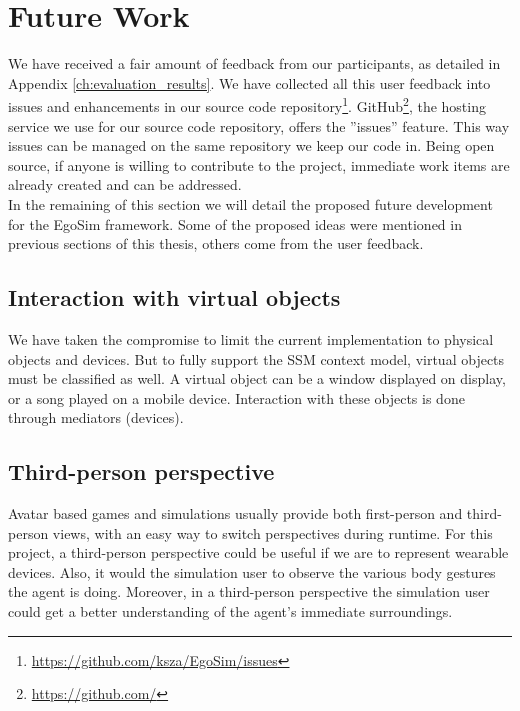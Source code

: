 \section{Future Work} %
\label{sec:future_work}
We have received a fair amount of feedback from our participants, as detailed in Appendix \ref{ch:evaluation_results}. We have collected all this user feedback into issues and enhancements in our source code repository\footnote{\url{https://github.com/ksza/EgoSim/issues}}. GitHub\footnote{\url{https://github.com/}}, the hosting service we use for our source code repository, offers the ''issues'' feature. This way issues can be managed on the same repository we keep our code in. Being open source, if anyone is willing to contribute to the project, immediate work items are already created and can be addressed.\\

In the remaining of this section we will detail the proposed future development for the EgoSim framework. Some of the proposed ideas were mentioned in previous sections of this thesis, others come from the user feedback.\\

\subsection{Interaction with virtual objects} 
We have taken the compromise to limit the current implementation to physical objects and devices. But to fully support the SSM context model, virtual objects must be classified as well. A virtual object can be a window displayed on display, or a song played on a mobile device. Interaction with these objects is done through mediators (devices).

\subsection{Third-person perspective} 
Avatar based games and simulations usually provide both first-person and third-person views, with an easy way to switch perspectives during runtime. For this project, a third-person perspective could be useful if we are to represent wearable devices. Also, it would the simulation user to observe the various body gestures the agent is doing. Moreover, in a third-person perspective the simulation user could get a better understanding of the agent's immediate surroundings.


